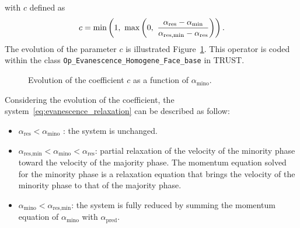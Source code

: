with $c$ defined as
\begin{equation}
    \label{eq:evanescence_relaxation}
    c = \text{min}\parent{1,\ \text{max} \parent{0,\ \frac{\alpha_{\text{res}}-\alpha_{\text{min}}}{\alpha_{\text{res,min}}-\alpha_{\text{res}}}}}.
\end{equation}
The evolution of the parameter $c$ is illustrated Figure~\ref{fig:evanescence_relaxation}. This operator is coded within the class \texttt{Op\_Evanescence\_Homogene\_Face\_base} in TRUST.

\begin{figure}[ht]
  \centering
{}
  \caption{Evolution of the coefficient $c$ as a function of $\alpha_{\text{mino}}$.}
  \label{fig:evanescence_relaxation}
\end{figure}

Considering the evolution of the coefficient, the system~\ref{eq:evanescence_relaxation} can be described as follow:
\begin{itemize}
    \item $\alpha_{\text{res}} < \alpha_{\text{mino}}$ : the system is unchanged.
    \item $\alpha_{\text{res,min}} < \alpha_{\text{mino}} < \alpha_{\text{res}}$: partial relaxation of the velocity of the minority phase toward the velocity of the majority phase. The momentum equation solved for the minority phase is a relaxation equation that brings the velocity of the minority phase to that of the majority phase.
    \item $\alpha_{\text{mino}} < \alpha_{\text{res,min}}$: the system is fully reduced by summing the momentum equation of $\alpha_{\text{mino}}$ with $\alpha_{\text{pred}}$. 
\end{itemize}

